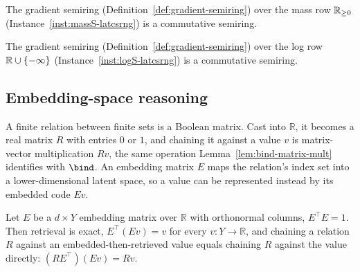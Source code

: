 \begin{instance}
\label{inst:gradsemiring-mass}
\leanok
The gradient semiring (Definition~\ref{def:gradient-semiring}) over the
mass row $\mathbb R_{\ge 0}$ (Instance~\ref{inst:massS-latcsrng}) is a commutative
semiring.
\end{instance}

\begin{instance}
\label{inst:gradsemiring-log}
\leanok
The gradient semiring (Definition~\ref{def:gradient-semiring}) over the
log row $\mathbb R \cup \{-\infty\}$ (Instance~\ref{inst:logS-latcsrng}) is a commutative
semiring.
\end{instance}

\subsection{Embedding-space reasoning}  %
\label{sec:embedding}

A finite relation between finite sets is a Boolean matrix. Cast into
$\mathbb R$, it becomes a real matrix $R$ with entries $0$ or $1$, and
chaining it against a value $v$ is matrix-vector multiplication $Rv$,
the same operation Lemma~\ref{lem:bind-matrix-mult} identifies with
$\bind$. An embedding matrix $E$ maps the relation's index set into a
lower-dimensional latent space, so a value can be represented instead
by its embedded code $Ev$.

\begin{theorem}
\label{thm:embedding-exact}
\leanok
Let $E$ be a $d \times Y$ embedding matrix over $\mathbb R$ with
orthonormal columns, $E^\top E = 1$. Then retrieval is exact,
$E^\top(Ev) = v$ for every $v \colon Y \to \mathbb R$, and chaining a
relation $R$ against an embedded-then-retrieved value equals chaining
$R$ against the value directly: $(RE^\top)(Ev) = Rv$.
\end{theorem}

